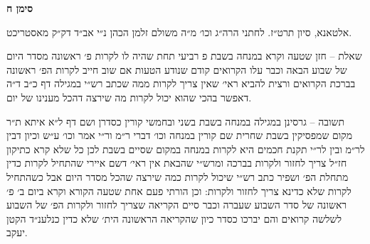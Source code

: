 \documentclass[12pt, openany]{book}
\newcommand{\chapname}{}
\newcommand{\newchap}[1]{
	\addcontentsline{toc}{chapter}{#1}
	\renewcommand{\chapname}{#1}
		\begin{center}
			\textbf{%
\fontsize{16pt}{16pt}\selectfont
				#1}
		\end{center}
}
\begin{document}
\newchap{סימן ח}
\begin{multicols}{2}
אלטאנא, סיון תרט״ז. לחתני הרה״ג וכו׳ מ״ה משולם זלמן הכהן נ״י אב״ד דק״ק מאסטריכט.\\\vspace{0pt}

שאלת – חזן שטעה וקרא במנחה בשבת פ רביעי תחת שהיה לו לקרות פ׳ ראשונה מסדר היום של שבוע הבאה וכבר עלו הקרואים קודם שנודע הטעות אם שוב חייב לקרות הפ׳ ראשונה בברכת הקרואים ורצית להביא ראי׳ שאין צריך לקרות ממה שכתב רש״י במגילה דף כ״ב ד״ה דאפשר בהכי שהוא יכול לקרות מה שירצה דהכל מענינו של יום.\\\vspace{0pt}

תשובה – גרסינן במגילה במנחה בשבת בשני ובחמשי קורין כסדרן ושם דף ל״א איתא ת״ר מקום שמפסיקין בשבת שחרית שם קורין במנחה וכו׳ דברי ר״מ ור״י אמר וכו׳ ע״ש וכיון דבין לר״מ ובין לר״י תקנת חכמים היא לקרות במנחה במקום שסיים בשבת לכן כל שלא קרא כתיקון חז״ל צריך לחזור ולקרות בברכה ומרש״י שהבאת אין ראי׳ דשם איירי שהתחיל לקרות כדין מתחלת הפ׳ ושפיר כתב רש״י שיכול לקרות כמה שירצה שהכל מסדר היום אבל כשהתחיל לקרות שלא כדינא צריך לחזור ולקרות: וכן הורתי פעם אחת שטעה הקורא וקרא ביום ב׳ פ׳ ראשונה של סדר השבוע שעברה וכבר סיים הקריאה שצריך לחזור ולקרות הפ׳ של השבוע לשלשה קרואים והם יברכו כסדר כיון שהקריאה הראשונה הית׳ שלא כדין כנלענ״ד הקטן יעקב.\\\vspace{0pt}

\end{multicols}\newpage
\end{document}
